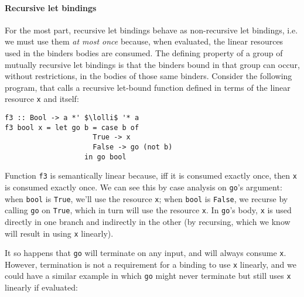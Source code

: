 \documentclass[acmsmall,review,anonymous,screen]{acmart}
\newcommand{\incode}[1]{\lstinline{#1}}
\newcommand{\lolli}{\multimap}
\begin{document}
\paragraph{Recursive let bindings\label{sec:semantic-linearity-examples:recursive-lets}}
For the most part,
recursive let bindings behave as non-recursive let bindings, i.e. we must use them \emph{at
most once} because, when evaluated, the linear resources used in the binders
bodies are consumed. The defining property of a group of mutually recursive let
bindings is that the binders bound in that group can occur, without restrictions, in
the bodies of those same binders. %
Consider the following program, that calls a recursive let-bound function
defined in terms of the linear resource \incode{x} and itself:
%
\begin{notyet}
\begin{lstlisting}
f3 :: Bool -> a *' $\lolli$ '* a
f3 bool x = let go b = case b of
                     True -> x
                     False -> go (not b)
                   in go bool
\end{lstlisting}
\end{notyet}
%
Function \incode{f3} is semantically linear because, iff it is consumed exactly once,
then \incode{x} is consumed exactly once. We can see this by case analysis on \incode{go}'s argument:
when \incode{bool} is \incode{True}, we'll use the resource \incode{x};
 when \incode{bool} is \incode{False}, we recurse by calling \incode{go} on \incode{True}, which in turn will use the resource \incode{x}.
In \incode{go}'s body, \incode{x} is used directly in one branch and indirectly in the
other (by recursing, which we know will result in using \incode{x} linearly).
%

It so happens that \incode{go} will terminate on any input, and will always consume
\incode{x}. However, termination is not a requirement for a binding to use \incode{x} linearly,
and we could have a similar example in which \incode{go} might never terminate but still
uses \incode{x} linearly if evaluated:
\end{document}
